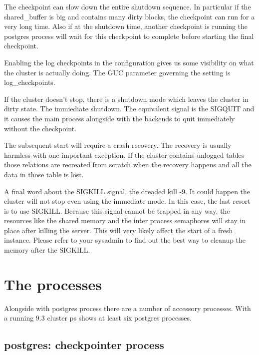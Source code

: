 The checkpoint can slow down the entire shutdown sequence. In particular if the
shared\_buffer is big and contains many dirty blocks, the checkpoint can run
for a very long time. Also if at the shutdown time, another checkpoint is
running the postgres process will wait for this checkpoint to complete before
starting the final checkpoint.\newline

Enabling the log checkpoints in the configuration gives us some visibility on
what the cluster is actually doing. The GUC parameter governing the setting is
log\_checkpoints.\newline

If the cluster doesn't stop, there is a shutdown mode which leaves the cluster
in dirty state. The immiediate shutdown. The equivalent signal is the SIGQUIT
and it causes the main process alongside with the backends to quit immediately
without the checkpoint.\newline

The subsequent start will require a crash recovery. The recovery is usually
harmless with one important exception. If the cluster contains unlogged tables
those relations are recreated from scratch when the recovery happens and all
the data in those table is lost.

A final word about the SIGKILL signal, the dreaded kill -9. It could happen the
cluster will not stop even using the immediate mode. In this case, the last
resort is to use SIGKILL. Because this signal cannot be trapped in any way, the
resources like the shared memory and the inter process semaphores will stay in
place after killing the server. This will very likely affect the start of a
fresh instance. Please refer to your sysadmin to find out the best way to
cleanup the memory after the SIGKILL.

\section{The processes}

\label{sec:PROCESSES}

Alongside with postgres process there are a number of accessory processes. With
a running 9.3 cluster ps shows at least six postgres processes.

\subsection{postgres: checkpointer process}

